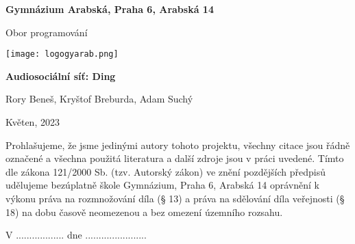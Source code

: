 
\begin{titlepage}
\begin{center}
\large \vspace*{\fill}
\thispagestyle{empty}

\LARGE

{ \huge \textbf{Gymnázium Arabská, Praha 6, Arabská 14}}

{\LARGE Obor programování }

\vfill
\texttt{[image: logogyarab.png]}
\vspace{15pt}

\vfill

{\huge \textbf{Audiosociální síť: Ding}}

\vfill

Rory Beneš, Kryštof Breburda, Adam Suchý

\vfill

{\large Květen, 2023}

\vspace*{\fill}
\end{center}
\end{titlepage}

\thispagestyle{empty}
\addtocounter{page}{-1}
\vspace*{\fill}
Prohlašujeme, že jsme jedinými autory tohoto projektu, všechny citace jsou řádně označené a všechna 
použitá literatura a další zdroje jsou v práci uvedené. Tímto dle zákona 121/2000 Sb. (tzv. Autorský zákon) 
ve znění pozdějších předpisů udělujeme bezúplatně škole Gymnázium, Praha 6, Arabská 14 oprávnění k výkonu 
práva na rozmnožování díla (§ 13) a práva na sdělování díla veřejnosti (§ 18) na dobu časově neomezenou a 
bez omezení územního rozsahu.

\vspace{2cm}
V .................. dne .......................


\vspace{2cm}


\vspace{2cm}

